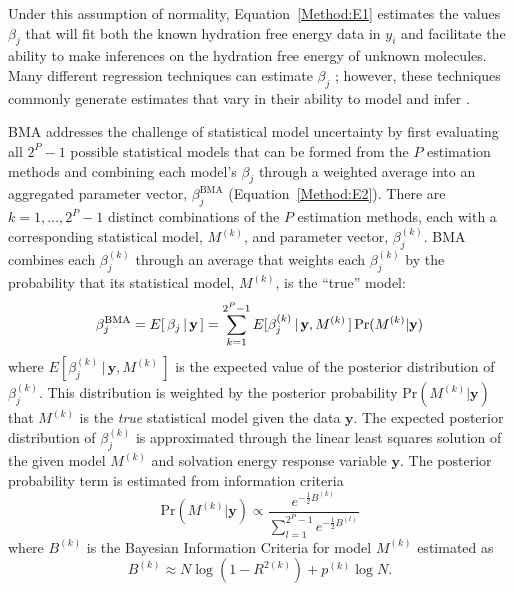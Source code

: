 \documentclass[journal=jpcbfk, manuscript=article]{achemso}
\newcommand{\LG}[1]{\textcolor{black}{#1}}
\newcommand{\+}[1]{\ensuremath{\mathbf{#1}}}
\renewcommand{\vec}[1]{{\mathbf{#1}}}
\newcommand{\rev}[1]{#1}
\begin{document}
\rev{Under this assumption of normality, Equation~\ref{Method:E1} estimates the values $\beta_j$ that will fit both the known hydration free energy data in $y_i$ and facilitate the ability to make inferences on the hydration free energy of unknown molecules.  
Many different regression techniques can estimate $\beta_j$ \cite{Hosmer:1989,Reiss:2012,Mallows:1973,Candes:2007}; however, these techniques commonly generate estimates that vary in their ability to model and infer \cite{Genell:2010,Hoeting:1999,Davidson:2006,Raftery:1995,Raftery:1998}.}

BMA addresses the challenge of statistical model uncertainty by first evaluating all $2^{P}-1$ possible statistical models that can be formed from the $P$ estimation methods and combining each model's $\beta_j$ through a weighted average into an aggregated parameter vector, $\beta_j^{\text{BMA}}$ (Equation~\ref{Method:E2}).
There are $k = 1, \ldots, 2^P-1$ distinct combinations of the $P$ estimation methods, each with a corresponding statistical model, $M^{(k)}$, and parameter vector, $\beta^{(k)}_j$. 
BMA combines each $\beta_{j}^{(k)}$ through an average that weights each $\beta^{(k)}_j$ by the probability that its statistical model, $M^{(k)}$, is the ``true'' model:
\begin{equation} \label{Method:E2}
	\LG{\beta_j^{\text{BMA}} = E[\,\beta_j \,|\, \+y\,]  = \sum_{k=1}^{2^P-1} E[\beta_{j}^{(k)}\,|\, \+y,M^{(k)}\,] \, {\mathrm{Pr}}(M^{(k)} | \+y)}
\end{equation}
where $E[\beta_{j}^{(k)}\,|\, \+y,M^{(k)}\,]$ is the expected value of the posterior distribution of $\beta^{(k)}_j$.
This distribution is weighted by the posterior probability ${\mathrm{Pr}}(M^{(k)} | \+y)$ that $M^{(k)}$ is the \emph{true} statistical model given the data $\textbf{y}$.
The expected posterior distribution of $\beta^{(k)}_j$ is approximated through the linear least squares solution of the given model $M^{(k)}$ and solvation energy response variable $\vec{y}$.
The posterior probability term is estimated from information criteria \cite{Raftery:1995}
\begin{equation} \label{Method:E3} 
	{\mathrm{Pr}}(M^{(k)} | \+y) \propto \frac{e^{-\frac{1}{2}B^{(k)}}}{\sum^{2^P-1}_{l=1} e^{-\frac{1}{2}B^{(l)}}} 
\end{equation}
where $B^{(k)}$ is the Bayesian Information Criteria for model $M^{(k)}$ estimated as
\begin{equation} \label{Method:E4} 
	B^{(k)} \approx N \log{(1-R^{2(k)})} + p^{(k)} \log{N}.
\end{equation}
\end{document}
